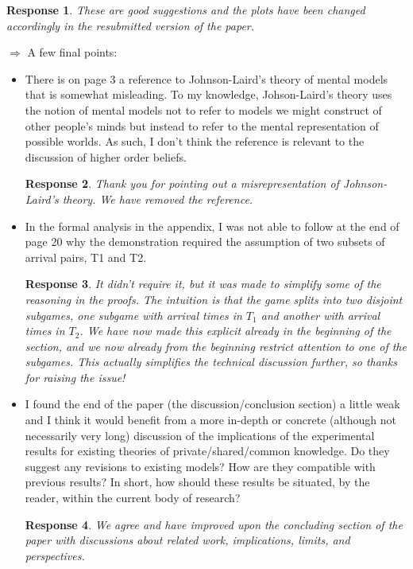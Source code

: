 \documentclass[a4paper]{article}
\newtheorem{response}{Response}
\newenvironment{tobo}{\smallskip \noindent \color{yellow!80!black!80}}{\color{black}\smallskip}
\begin{document}
\begin{itemize}
\begin{response}These are good suggestions and the plots have been changed accordingly in the resubmitted version of the paper. \end{response}

\end{itemize}

$\Rightarrow$ A few final points:
\begin{itemize}
\item  There is on page 3 a reference to Johnson-Laird's theory of mental models that is somewhat misleading. To my knowledge, Johson-Laird's theory uses the notion of mental models not to refer to models we might construct of other people's minds but instead to refer to the mental representation of possible worlds. As such, I don't think the reference is relevant to the discussion of higher order beliefs.

\begin{response} Thank you for pointing out a misrepresentation of Johnson-Laird's theory. We have removed the reference.\end{response}
 
\item In the formal analysis in the appendix, I was not able to follow at the end of page 20 why the demonstration required the assumption of two subsets of arrival pairs, T1 and T2.

\begin{response}
It didn't \emph{require} it, but it was made to simplify some of the reasoning in the proofs. The intuition is that the game splits into two disjoint subgames, one subgame with arrival times in $T_1$ and another with arrival times in $T_2$. We have now made this explicit already in the beginning of the section, and we now already from the beginning restrict attention to one of the subgames. This actually simplifies the technical discussion further, so thanks for raising the issue!
\end{response} 



\item I found the end of the paper (the discussion/conclusion section) a little weak and I think it would benefit from a more in-depth or concrete (although not necessarily very long) discussion of the implications of the experimental results for existing theories of private/shared/common knowledge. Do they suggest any revisions to existing models? How are they compatible with previous results? In short, how should these results be situated, by the reader, within the current body of research?

\begin{response} 
We agree and have improved upon the concluding section of the paper with discussions about related work, implications, limits, and perspectives. 
\end{response}
\end{itemize}
\end{document}
